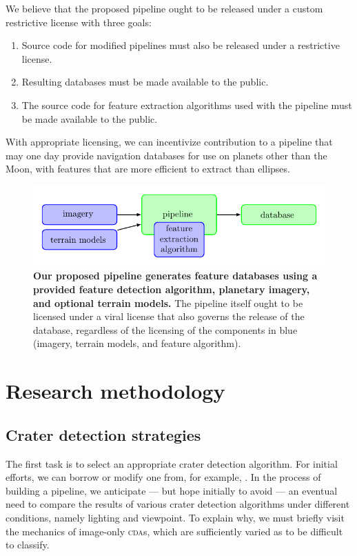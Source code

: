 \documentclass[12pt]{olfmemo}
\begin{document}
We believe that the proposed pipeline ought to be released under a custom restrictive license with three goals:
\begin{enumerate}
\item Source code for modified pipelines must also be released under a restrictive license.
\item Resulting databases must be made available to the public.
\item The source code for feature extraction algorithms used with the pipeline must be made available to the public.
\end{enumerate}
With appropriate licensing, we can incentivize contribution to a pipeline that may one day provide navigation databases for use on planets other than the Moon, with features that are more efficient to extract than ellipses.

\begin{figure}
\center\includegraphics{flowchart.pdf}
\caption{\label{fig:flowchart}\textbf{Our proposed pipeline generates feature databases using a provided feature detection algorithm, planetary imagery, and optional terrain models.} The pipeline itself ought to be licensed under a viral license that also governs the release of the database, regardless of the licensing of the components in blue (imagery, terrain models, and feature algorithm).}
\end{figure}

\section{Research methodology}
\subsection{Crater detection strategies}
The first task is to select an appropriate crater detection algorithm. For initial efforts, we can borrow or modify one from, for example, \citet{Woicke2018}. In the process of building a pipeline, we anticipate --- but hope initially to avoid --- an eventual need to compare the results of various crater detection algorithms under different conditions, namely lighting and viewpoint. To explain why, we must briefly visit the mechanics of image-only \textsc{cda}s, which are sufficiently varied as to be difficult to classify.
\end{document}
